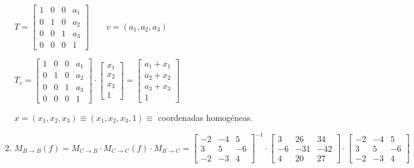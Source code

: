 \begin{enumerate}[label=\color{red}\textbf{\arabic*)}, leftmargin=*]
$T=\begin{bmatrix}
	1 & 0 & 0 & a_1 \\
	0 & 1 & 0 & a_2 \\
	0 & 0 & 1 & a_3 \\
	0 & 0 & 0 & 1
\end{bmatrix}\qquad v=(a_1,a_2,a_3)$

$T_v=\begin{bmatrix}
	1 & 0 & 0 & a_1 \\
	0 & 1 & 0 & a_2 \\
	0 & 0 & 1 & a_3 \\
	0 & 0 & 0 & 1
\end{bmatrix}\cdot\begin{bmatrix}
x_1\\
x_2\\
x_3\\
1
\end{bmatrix}=\begin{bmatrix}
a_1+x_1\\
a_2+x_2\\
a_3+x_3\\
1
\end{bmatrix}$

$x=(x_1,x_2,x_3)\equiv(x_1,x_2,x_3,1)\equiv$ coordenadas homogéneas.
    \item {}
  
  $M_{B\to B}(f)=M_{C\to B}\cdot M_{C\to C}(f)\cdot M_{B\to C}=\begin{bmatrix}
        -2 & -4 & 5 \\
        3 & 5 & -6 \\
        -2 & -3 & 4
  \end{bmatrix}^{-1}\cdot\begin{bmatrix}
  3 & 26 & 34 \\
  -6 & -31 & -42 \\
  4 & 20 & 27
  \end{bmatrix}\cdot\begin{bmatrix}
  -2 & -4 & 5 \\
  3 & 5 & -6 \\
  -2 & -3 & 4
  \end{bmatrix}$
  

\end{enumerate}
